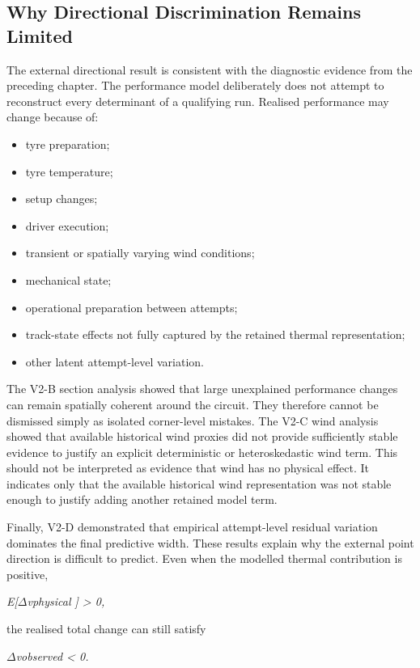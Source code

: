 \subsection{Why Directional Discrimination Remains Limited}
The external directional result is consistent with the diagnostic evidence from the preceding chapter. The performance model deliberately does not attempt to reconstruct every determinant of a qualifying run. Realised performance may change because of:

\begin{itemize}
\item tyre preparation;
\item tyre temperature;
\item setup changes;
\item driver execution;
\item transient or spatially varying wind conditions;
\item mechanical state;
\item operational preparation between attempts;
\item track-state effects not fully captured by the retained thermal representation;
\item other latent attempt-level variation.
\end{itemize}

The V2-B section analysis showed that large unexplained performance changes can remain spatially coherent around the circuit. They therefore cannot be dismissed simply as isolated corner-level mistakes. The V2-C wind analysis showed that available historical wind proxies did not provide sufficiently stable evidence to justify an explicit deterministic or heteroskedastic wind term. This should not be interpreted as evidence that wind has no physical effect. It indicates only that the available historical wind representation was not stable enough to justify adding another retained model term.

Finally, V2-D demonstrated that empirical attempt-level residual variation dominates the final predictive width. These results explain why the external point direction is difficult to predict. Even when the modelled thermal contribution is positive,

\begin{center}\textit{E[\ensuremath{\Delta}vphysical ] > 0,}\end{center}

the realised total change can still satisfy

\begin{center}\textit{\ensuremath{\Delta}vobserved < 0.}\end{center}

